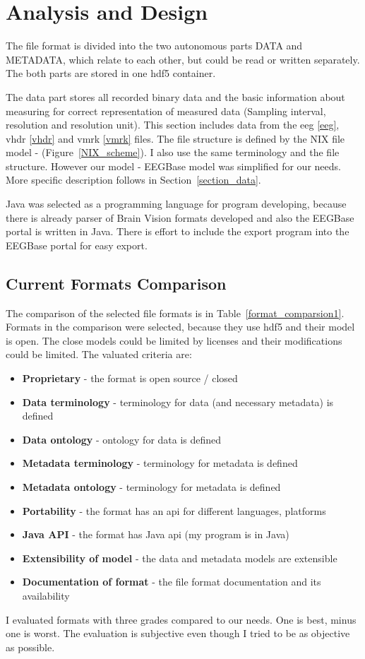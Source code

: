 \chapter {Analysis and Design}
The file format is divided into the two autonomous parts DATA and METADATA, which relate to each other, but could be read or written separately. The both parts are stored in one \gls{hdf5} container.

The data part stores all recorded binary data and the basic information about measuring for correct representation of measured data (Sampling interval, resolution and resolution unit). This section includes data from the eeg \ref{eeg}, vhdr \ref{vhdr} and vmrk \ref{vmrk} files. The file structure is defined by the NIX file model - (Figure~\ref{NIX_scheme}). I also use the same terminology and the file structure. However our model - EEGBase model was simplified for our needs. More specific description follows in Section~\ref{section_data}.

Java was selected as a programming language for program developing, because there is already parser of Brain Vision formats developed and also the EEGBase portal is written in Java. There is effort to include the export program into the EEGBase portal for easy export.



\section{Current Formats Comparison}
The comparison of the selected file formats is in Table~\ref{format_comparsion1}. Formats in the comparison were selected, because they use \gls{hdf5} and their model is open. The close models could be limited by licenses and their modifications could be limited.
The valuated criteria are: 
\begin{itemize}
\item \textbf{Proprietary} - the format is open source / closed
\item \textbf{Data terminology} - terminology for data (and necessary metadata) is defined
\item \textbf{Data ontology} - ontology for data is defined
\item \textbf{Metadata terminology} - terminology for metadata is defined
\item \textbf{Metadata ontology} - terminology for metadata is defined
\item \textbf{Portability} - the format has an \gls{api} for different languages, platforms
\item \textbf{Java API} - the format has Java \gls{api} (my program is in Java)
\item \textbf{Extensibility of model} - the data and metadata models are extensible
\item \textbf{Documentation of format} - the file format documentation and its availability
\end{itemize}
I evaluated formats with three grades compared to our needs. One is best, minus one is worst. The evaluation is subjective even though I tried to be as objective as possible.

